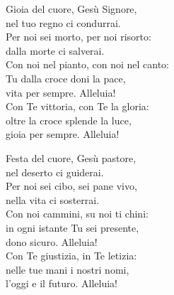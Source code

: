 
\strofa Gioia del cuore, Gesù Signore,\\
nel tuo regno ci condurrai.\\
Per noi sei morto, per noi risorto:\\
dalla morte ci salverai.\\
Con noi nel pianto, con noi nel canto:\\
Tu dalla croce doni la pace,\\
vita per sempre. Alleluia!\\
Con Te vittoria, con Te la gloria:\\
oltre la croce splende la luce,\\
gioia per sempre. Alleluia!

\spazio

\strofa Festa del cuore, Gesù pastore,\\
nel deserto ci guiderai.\\
Per noi sei cibo, sei pane vivo,\\
nella vita ci sosterrai.\\
Con noi cammini, su noi ti chini:\\
in ogni istante Tu sei presente,\\
dono sicuro. Alleluia!\\
Con Te giustizia, in Te letizia:\\
nelle tue mani i nostri nomi,\\
l'oggi e il futuro. Alleluia!